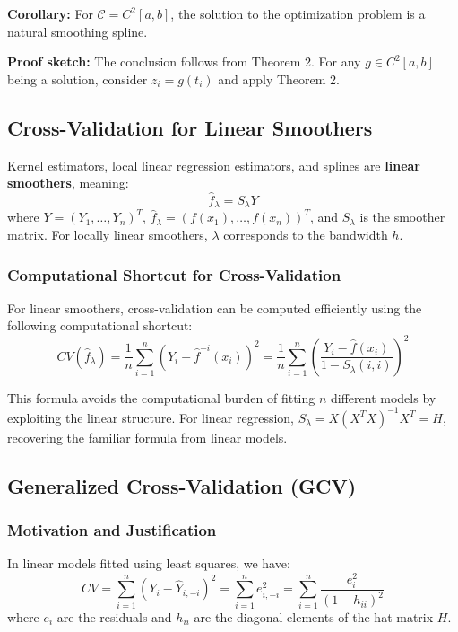 \documentclass[12pt,a4paper]{article}
\begin{document}
\textbf{Corollary:} For $\mathcal{C} = C^2[a,b]$, the solution to the optimization problem is a natural smoothing spline.

\textbf{Proof sketch:} The conclusion follows from Theorem 2. For any $g \in C^2[a,b]$ being a solution, consider $z_i = g(t_i)$ and apply Theorem 2.

\subsection{Cross-Validation for Linear Smoothers}

Kernel estimators, local linear regression estimators, and splines are \textbf{linear smoothers}, meaning:
\begin{equation}
\hat{f}_\lambda = S_\lambda Y
\end{equation}
where $Y = (Y_1, \ldots, Y_n)^T$, $\hat{f}_\lambda = (f(x_1), \ldots, f(x_n))^T$, and $S_\lambda$ is the smoother matrix. For locally linear smoothers, $\lambda$ corresponds to the bandwidth $h$.

\subsubsection{Computational Shortcut for Cross-Validation}

For linear smoothers, cross-validation can be computed efficiently using the following computational shortcut:
\begin{equation}
CV(\hat{f}_\lambda) = \frac{1}{n}\sum_{i=1}^n (Y_i - \hat{f}^{-i}(x_i))^2 = \frac{1}{n}\sum_{i=1}^n \left(\frac{Y_i - \hat{f}(x_i)}{1 - S_\lambda(i,i)}\right)^2
\end{equation}

This formula avoids the computational burden of fitting $n$ different models by exploiting the linear structure. For linear regression, $S_\lambda = X(X^TX)^{-1}X^T = H$, recovering the familiar formula from linear models.

\subsection{Generalized Cross-Validation (GCV)}

\subsubsection{Motivation and Justification}

In linear models fitted using least squares, we have:
\begin{equation}
CV = \sum_{i=1}^n (Y_i - \hat{Y}_{i,-i})^2 = \sum_{i=1}^n e_{i,-i}^2 = \sum_{i=1}^n \frac{e_i^2}{(1 - h_{ii})^2}
\end{equation}
where $e_i$ are the residuals and $h_{ii}$ are the diagonal elements of the hat matrix $H$.
\end{document}
